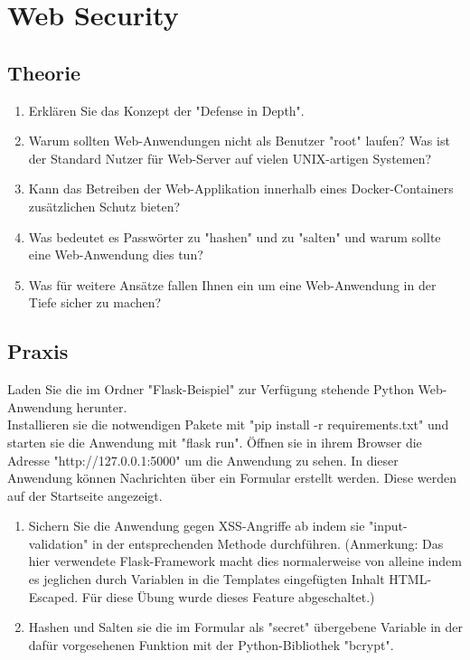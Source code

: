 \documentclass[ngerman]{article}
\begin{document}
\section{Web Security}

\subsection{Theorie}
\begin{enumerate}
    \item Erklären Sie das Konzept der "Defense in Depth".
    \item Warum sollten Web-Anwendungen nicht als Benutzer "root" laufen? Was ist der Standard Nutzer für Web-Server auf vielen UNIX-artigen Systemen?
    \item Kann das Betreiben der Web-Applikation innerhalb eines Docker-Containers zusätzlichen Schutz bieten?
    \item Was bedeutet es Passwörter zu "hashen" und zu "salten" und warum sollte eine Web-Anwendung dies tun?
    \item Was für weitere Ansätze fallen Ihnen ein um eine Web-Anwendung in der Tiefe sicher zu machen?
\end{enumerate}

\subsection{Praxis}
Laden Sie die im Ordner "Flask-Beispiel" zur Verfügung stehende Python Web-Anwendung herunter. \\
Installieren sie die notwendigen Pakete mit "pip install -r requirements.txt" und starten sie die Anwendung mit "flask run". Öffnen sie in ihrem Browser die Adresse "http://127.0.0.1:5000" um die Anwendung zu sehen.
In dieser Anwendung können Nachrichten über ein Formular erstellt werden. Diese werden auf der Startseite angezeigt.

\begin{enumerate}
    \item Sichern Sie die Anwendung gegen XSS-Angriffe ab indem sie "input-validation" in der entsprechenden Methode durchführen. (Anmerkung: Das hier verwendete Flask-Framework macht dies normalerweise von alleine indem es jeglichen durch Variablen in die Templates eingefügten Inhalt HTML-Escaped. Für diese Übung wurde dieses Feature abgeschaltet.)
    \item Hashen und Salten sie die im Formular als "secret" übergebene Variable in der dafür vorgesehenen Funktion mit der Python-Bibliothek "bcrypt".
\end{enumerate}
\end{document}
